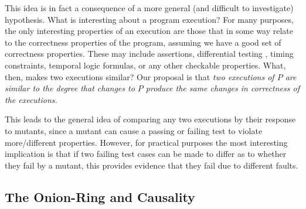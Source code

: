 This idea is in fact a consequence of a more general (and difficult to investigate) hypothesis.  What is interesting about a program execution?  For many purposes, the only interesting properties of an execution are those that in some way relate to the correctness properties of the program, assuming we have a good set of correctness properties.  These may include assertions, differential testing \cite{Differential,ICSEDiff}, timing constraints, temporal logic formulas, or any other checkable properties.  What, then, makes two executions similar?  Our proposal is that \emph{two executions of $P$ are similar to the degree that changes to $P$ produce the same changes in correctness of the executions.}

This leads to the general idea of comparing any two executions by their response to mutants, since a mutant can cause a passing or failing test to violate more/different properties.   However, for practical purposes the most interesting implication is that if two failing test cases can be made to differ as to whether they fail by a mutant, this provides evidence that they fail due to different faults.


\subsection{The Onion-Ring and Causality}

